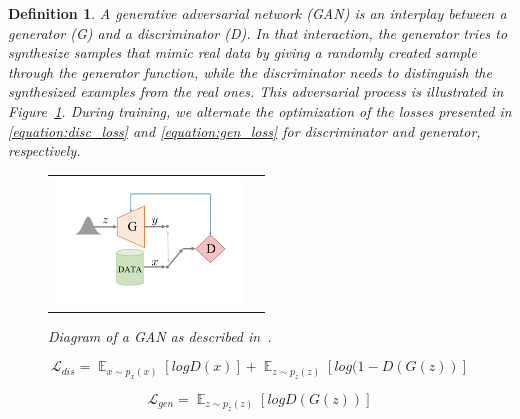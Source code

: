 \documentclass[12pt]{article}
\newtheorem{definition}{Definition}
\begin{document}
    \begin{definition}
        \normalfont
        A \emph{generative adversarial network} (GAN) \cite{NIPS2014_5ca3e9b1} is an interplay between a \emph{generator} (G) and a \emph{discriminator} (D).
        In that interaction, the generator tries to synthesize samples that mimic real data by giving a randomly created sample through the generator function, while the discriminator needs to distinguish the synthesized examples from the real ones. This adversarial process is illustrated in Figure~\ref{figure:diagram_of_gan}. During training, we alternate the optimization of the losses presented in \eqref{equation:disc_loss} and \eqref{equation:gen_loss} for discriminator and generator, respectively.

        \begin{figure}[H]
            \centering
            \begin{tabular}{cc}
                \includegraphics[width = 50mm]{gan}
            \end{tabular}
            \caption{Diagram of a GAN as described in~\cite{pmlr-v80-achlioptas18a}.}
            \label{figure:diagram_of_gan}
        \end{figure}

        \begin{equation}
            \mathcal{L}_{dis} = \mathop{\mathbb{E}}_{x \sim p_x(x)}[log D(x)] + \mathop{\mathbb{E}}_{z \sim p_z(z)}[log (1 - D(G(z))]
            \label{equation:dis_loss}
        \end{equation}

        \begin{equation}
            \mathcal{L}_{gen} = \mathop{\mathbb{E}}_{z \sim p_z(z)}[log D(G(z))]
            \label{equation:gen_loss}
        \end{equation}

    \end{definition}
\end{document}
